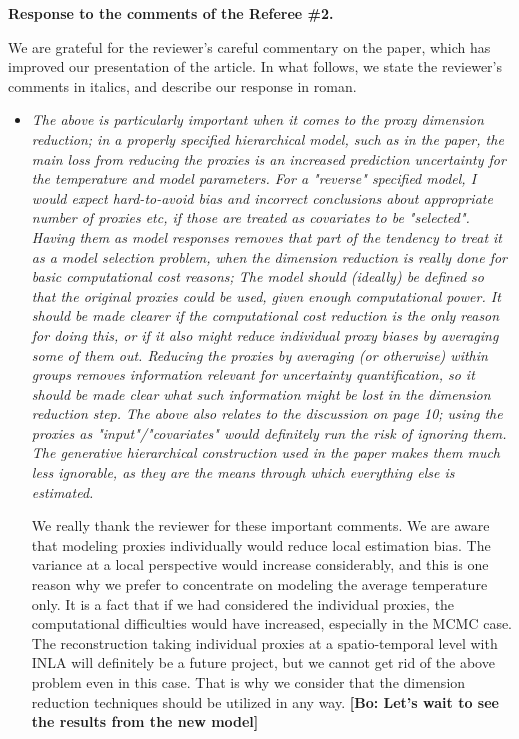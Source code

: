 \documentclass[11pt]{article}
\newcommand{\bl}[1]{\color{red}\textbf{[Bo: #1]}\normalcolor}
\begin{document}
\begin{center}
  {\Large \textbf{Response to the comments of the Referee \#2.}}
\end{center}

We are grateful for the reviewer's careful commentary on the paper, which has improved
our presentation of the article. In what follows, we state the reviewer's
comments in italics, and describe our response in roman.

\begin{itemize}
\item \textit{The above is particularly important when it comes to the proxy
  dimension reduction; in a properly specified hierarchical model,
  such as in the paper, the main loss from reducing the proxies is an
  increased prediction uncertainty for the temperature and model
  parameters.  For a "reverse" specified model, I would expect
  hard-to-avoid bias and incorrect conclusions about appropriate
  number of proxies etc, if those are treated as covariates to be
  "selected". Having them as model responses removes that part of the
  tendency to treat it as a model selection problem, when the
  dimension reduction is really done for basic computational cost
  reasons; The model should (ideally) be defined so that the original
  proxies could be used, given enough computational power.  It should
  be made clearer if the computational cost reduction is the only
  reason for doing this, or if it also might reduce individual proxy
  biases by averaging some of them out.  Reducing the proxies by
  averaging (or otherwise) within groups removes information relevant
  for uncertainty quantification, so it should be made clear what such
  information might be lost in the dimension reduction step. The above also relates to the discussion on page 10; using the
  proxies as "input"/"covariates" would definitely run the risk of
  ignoring them. The generative hierarchical construction used in the
  paper makes them much less ignorable, as they are the means through
  which everything else is estimated.}

We really thank the reviewer for these important comments. We are aware that
modeling proxies individually would reduce local estimation bias. The variance
at a local perspective would increase considerably, and this is one reason why
we prefer to concentrate on modeling the average temperature only. It is a fact
that if we had considered the individual proxies, the computational difficulties
would have increased, especially in the MCMC case. The reconstruction taking
individual proxies at a spatio-temporal level with INLA will definitely be a
future project, but we cannot get rid of the above problem even in this case.
That is why we consider that the dimension reduction techniques should be
utilized in any way.
\bl{Let's wait to see the results from the new model}


\end{itemize}
\end{document}
